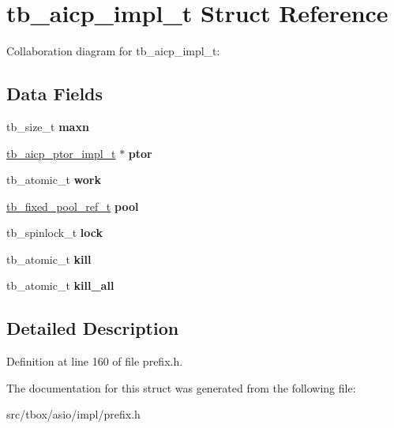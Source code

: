\hypertarget{structtb__aicp__impl__t}{\section{tb\-\_\-aicp\-\_\-impl\-\_\-t Struct Reference}
\label{structtb__aicp__impl__t}
}


Collaboration diagram for tb\-\_\-aicp\-\_\-impl\-\_\-t\-:
\subsection*{Data Fields}
\begin{DoxyCompactItemize}
\item 
\hypertarget{structtb__aicp__impl__t_a61146e3905badd894e675e3e70b52674}{tb\-\_\-size\-\_\-t {\bfseries maxn}}\label{structtb__aicp__impl__t_a61146e3905badd894e675e3e70b52674}

\item 
\hypertarget{structtb__aicp__impl__t_aca33664d92a8d788c6e9f003d315ecb8}{\hyperlink{structtb__aicp__ptor__impl__t}{tb\-\_\-aicp\-\_\-ptor\-\_\-impl\-\_\-t} $\ast$ {\bfseries ptor}}\label{structtb__aicp__impl__t_aca33664d92a8d788c6e9f003d315ecb8}

\item 
\hypertarget{structtb__aicp__impl__t_af05f0d2d7be45198415f951d2a360ec4}{tb\-\_\-atomic\-\_\-t {\bfseries work}}\label{structtb__aicp__impl__t_af05f0d2d7be45198415f951d2a360ec4}

\item 
\hypertarget{structtb__aicp__impl__t_aa330fa80511906f085d175b1a72f32ba}{\hyperlink{structtb__fixed__pool__ref__t}{tb\-\_\-fixed\-\_\-pool\-\_\-ref\-\_\-t} {\bfseries pool}}\label{structtb__aicp__impl__t_aa330fa80511906f085d175b1a72f32ba}

\item 
\hypertarget{structtb__aicp__impl__t_ab992eb7715f7cfc02e1224893b339f1a}{tb\-\_\-spinlock\-\_\-t {\bfseries lock}}\label{structtb__aicp__impl__t_ab992eb7715f7cfc02e1224893b339f1a}

\item 
\hypertarget{structtb__aicp__impl__t_a7b88df02141658fe087851132a02d51c}{tb\-\_\-atomic\-\_\-t {\bfseries kill}}\label{structtb__aicp__impl__t_a7b88df02141658fe087851132a02d51c}

\item 
\hypertarget{structtb__aicp__impl__t_ac28a6c4515a8e38888dbc405ad44f0fb}{tb\-\_\-atomic\-\_\-t {\bfseries kill\-\_\-all}}\label{structtb__aicp__impl__t_ac28a6c4515a8e38888dbc405ad44f0fb}

\end{DoxyCompactItemize}


\subsection{Detailed Description}


Definition at line 160 of file prefix.\-h.



The documentation for this struct was generated from the following file\-:\begin{DoxyCompactItemize}
\item 
src/tbox/asio/impl/prefix.\-h\end{DoxyCompactItemize}
